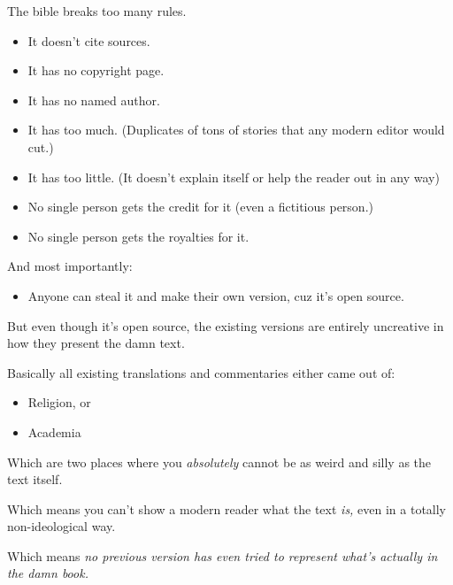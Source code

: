 \Sentence
{ \hX{} }
{ \eX{} }
{
    The bible breaks too many rules.

    \begin{itemize}

    \item It doesn't cite sources.

    \item It has no copyright page.

    \item It has no named author.

    \item It has too much. (Duplicates of tons of stories that any modern editor would cut.)

    \item It has too little. (It doesn't explain itself or help the reader out in any way)

    \item No single person gets the credit for it (even a fictitious person.)

    \item No single person gets the royalties for it.

    \end{itemize}
}

\Sentence
{ \hX{} }
{ \eX{} }
{
    And most importantly:

    \begin{itemize}

    \item Anyone can steal it and make their own version, cuz it's open source.

    \end{itemize}
}

\Sentence
{ \hX{} }
{ \eX{} }
{
    But even though it's open source, the existing versions are entirely uncreative in how they present the damn text.

    Basically all existing translations and commentaries either came out of:

    \begin{itemize}

    \item Religion, or

    \item Academia

    \end{itemize}
}

\Sentence
{ \hX{} }
{ \eX{} }
{
    Which are two places where you \emph{absolutely} cannot be as weird and silly as the text itself.

    Which means you can't show a modern reader what the text \emph{is,} even in a totally non-ideological way.

    Which means \emph{no previous version has even tried to represent what's actually in the damn book.}
}

